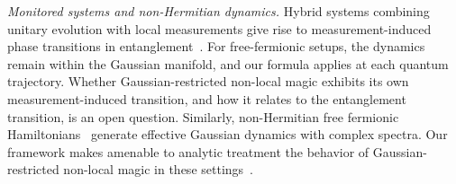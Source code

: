 \documentclass[aps,prl,twocolumn,superscriptaddress,reprint,longbibliography,nofootinbib]{revtex4-2}
\begin{document}
\emph{Monitored systems and non-Hermitian dynamics.}
Hybrid systems combining unitary evolution with local measurements give rise to measurement-induced phase transitions in entanglement~\cite{FisherRandom2023,Li_2025,oshima}.
For free-fermionic setups, the dynamics remain within the Gaussian manifold, and our formula applies at each quantum trajectory.
Whether Gaussian-restricted non-local magic exhibits its own measurement-induced transition, and how it relates to the entanglement transition, is an open question.
Similarly, non-Hermitian free fermionic Hamiltonians~\cite{Ashida_2020,kawabata2026nonhermitiandisorderedsystems} generate effective Gaussian dynamics with complex spectra.
Our framework makes amenable to analytic treatment the behavior of Gaussian-restricted non-local magic in these settings~\cite{schirooooo,gallo,granet,lapierre2025entanglementtransitionsstructuredrandom}.


\end{document}
